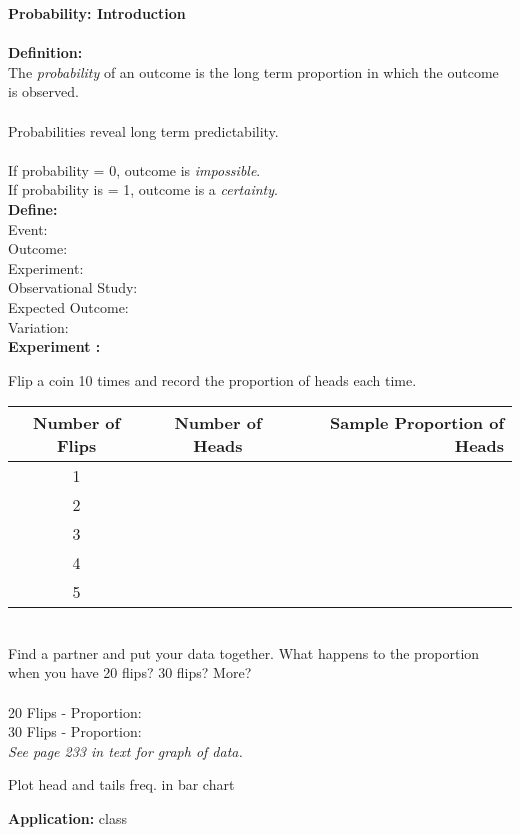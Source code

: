 \documentclass[12pt]{article}
\begin{document}
 \textbf{Probability: Introduction} \\
\\

\textbf{Definition:}
\\
 The \textit{probability} of an outcome is the long term proportion in which the outcome is observed. \\
\\
Probabilities reveal long term predictability. \\
\\
If probability = 0, outcome is \textit{impossible}. \\
If probability is = 1, outcome is a \textit{certainty}. \\ 

\textbf{Define:} \\
Event:\\
Outcome: \\
Experiment:\\
Observational Study: \\
Expected Outcome:\\
Variation:\\

 \textbf{Experiment :}

 Flip a coin 10 times and record the proportion of heads each time.\\

\begin{tabular}{| c | c | r |}
 \hline 
Number of Flips & Number of Heads & Sample Proportion of Heads \\  \hline 
1 &  & \\  [12pt] \hline 
2 & & \\  [12pt]  \hline 
3 & & \\ \hline 
4 & & \\  \hline 
5 & & \\  \hline 
\end{tabular}
\\
Find a partner and put your data together. What happens to the proportion when you have 20 flips? 30 flips? More?\\
\\
20 Flips - Proportion: \\
30 Flips - Proportion: \\
\noindent \textit{ See page 233 in text for graph of data.}

Plot head and tails freq. in bar chart 

\clearpage 

\textbf{Application:} class
\end{document}
